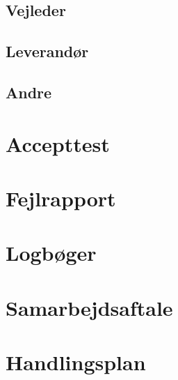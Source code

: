 \subsection{Vejleder}
\label{mailvejleder}

\subsection{Leverandør}
\label{mailleverandor}

\subsection{Andre}
\label{mailAndre}

\section{Accepttest}
\label{bilag:Accepttest}

\section{Fejlrapport}
\label{bilag:Fejlrapport}

\section{Logbøger}
\label{bilag:Logboger}

\section{Samarbejdsaftale}
\label{bilag:samarbejdsaftale}

\section{Handlingsplan}
\label{bilag:Handlingsplan}
